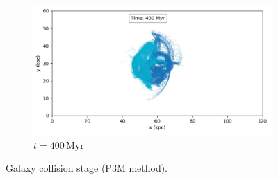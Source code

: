 \begin{figure}[H]
    \begin{subfigure}[b]{0.8\textwidth}
        \centering
        \includegraphics[width=\textwidth]{chapters/results/img/p3m-collision/400myr.png}
        \caption{$t=400\,\text{Myr}$}
        \label{fig:collision-p3m-sub3}
    \end{subfigure}

    \caption{Galaxy collision stage (P3M method).}
    \label{fig:collision-p3m}
\end{figure}

